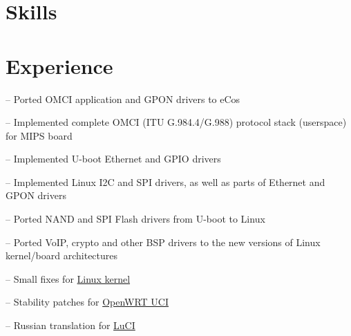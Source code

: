 \documentclass{cv}
\begin{document}
\section{Skills}
\begin{sklist}
\end{sklist}
\section{Experience}
\begin{joblist}
{
  \par -- Ported OMCI application and GPON drivers to eCos
}
{
  \par -- Implemented complete OMCI (ITU G.984.4/G.988) protocol stack (userspace) for MIPS board
  \par -- Implemented U-boot Ethernet and GPIO drivers
  \par -- Implemented Linux I2C and SPI drivers, as well as parts of Ethernet and GPON drivers
  \par -- Ported NAND and SPI Flash drivers from U-boot to Linux
  \par -- Ported VoIP, crypto and other BSP drivers to the new versions of Linux kernel/board architectures
}
{
  \par -- Small fixes for \href{http://git.kernel.org/?p=linux\%2Fkernel\%2Fgit\%2Ftorvalds\%2Flinux.git\&a=search\&h=HEAD\&st=commit\&s=Stanislav+Fomichev}{Linux kernel}
  \par -- Stability patches for \href{http://nbd.name/gitweb.cgi?p=uci.git\&a=search\&h=HEAD\&st=commit\&s=Stanislav+Fomichev}{OpenWRT UCI}
  \par -- Russian translation for \href{http://i18n.luci.subsignal.org/pootle/ru/}{LuCI}
}
\end{joblist}
\end{document}
